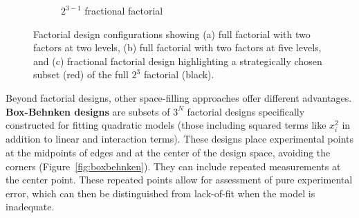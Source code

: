 \begin{figure}[H]
\begin{subfigure}[b]{0.3\textwidth}
        \caption{$2^{3-1}$ fractional factorial}
        \label{fig:fractional}
    \end{subfigure}
    \caption{Factorial design configurations showing (a) full factorial with two factors at two levels, (b) full factorial with two factors at five levels, and (c) fractional factorial design highlighting a strategically chosen subset (red) of the full $2^3$ factorial (black).}
    \label{fig:factorial_designs}
\end{figure}

Beyond factorial designs, other space-filling approaches offer different advantages. \textbf{Box-Behnken designs} are subsets of $3^N$ factorial designs specifically constructed for fitting quadratic models (those including squared terms like $x_i^2$ in addition to linear and interaction terms). These designs place experimental points at the midpoints of edges and at the center of the design space, avoiding the corners (Figure~\ref{fig:boxbehnken}). They can include repeated measurements at the center point. These repeated points allow for assessment of pure experimental error, which can then be distinguished from lack-of-fit when the model is inadequate.

